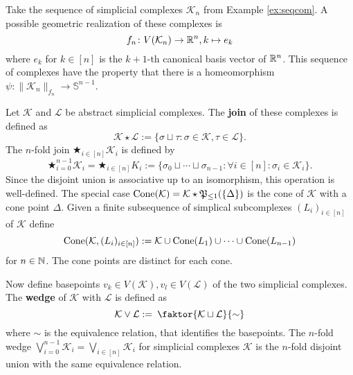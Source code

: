 \begin{ex}
  Take the sequence of simplicial complexes $\mathcal{K}_n$ from Example \ref{ex:seqcom}. A possible geometric realization of these complexes is
  \begin{equation*}
    f_n\colon V(\mathcal{K}_n) \to \mathbb{R}^n, k \mapsto e_k 
  \end{equation*}
  where $e_k$ for $k \in [n]$ is the $k+1$-th canonical basis vector of $\mathbb{R}^n$. This sequence of complexes have the property that there is a homeomorphism $\psi\colon \lVert \mathcal{K}_n \rVert_{f_n} \to \mathbb{S}^{n-1}$.
\end{ex}

\begin{defin}
  Let $\mathcal{K}$ and $\mathcal{L}$ be abstract simplicial complexes. The \textbf{join} of these complexes is defined as
  \begin{equation*}
    \mathcal{K} \star \mathcal{L} := \{\sigma \sqcup \tau\colon \sigma \in \mathcal{K}, \tau \in \mathcal{L} \}.
  \end{equation*}
  The $n$-fold join $\bigstar_{i \in [n]} \mathcal{K}_i$ is defined by
  \begin{equation*}
    \bigstar_{i=0}^{n-1} \mathcal{K}_i = \bigstar_{i \in [n]} K_i := \{\sigma_0 \sqcup \cdots \sqcup \sigma_{n-1}\colon \forall i\in [n]\colon \sigma_i \in \mathcal{K}_i\}.
  \end{equation*}
  Since the disjoint union is associative up to an isomorphism, this operation is well-defined.
  The special case ${\rm Cone}(\mathcal{K}) = \mathcal{K} \star \mathfrak{P}_{\leq 1}(\{ \Delta \})$ is the cone of $\mathcal{K}$ with a cone point $\Delta$. Given a finite subsequence of simplical subcomplexes $(L_i)_{i\in [n]}$ of $\mathcal{K}$ define \[{\rm Cone}(\mathcal{K}, (L_i)_{i\in [n]}) := \mathcal{K} \cup {\rm Cone}(L_1) \cup \cdots \cup {\rm Cone}(L_{n-1})\] for $n \in \mathbb{N}$. The cone points are distinct for each cone.

  
  Now define basepoints $v_k \in V(\mathcal{K}), v_l \in V(\mathcal{L})$ of the two simplicial complexes. The \textbf{wedge} of $\mathcal{K}$ with $\mathcal{L}$ is defined as
  \begin{equation*}
    \mathcal{K} \lor \mathcal{L} := \: \faktor{\mathcal{K} \sqcup \mathcal{L}}{\sim}
  \end{equation*}
  where $\sim$ is the equivalence relation, that identifies the basepoints.
  The $n$-fold wedge $\bigvee_{i=0}^{n-1} \mathcal{K}_i= \bigvee\limits_{i \in [n]} \mathcal{K}_i$ for simplicial complexes $\mathcal{K}$ is the $n$-fold disjoint union with the same equivalence relation.
\end{defin}

